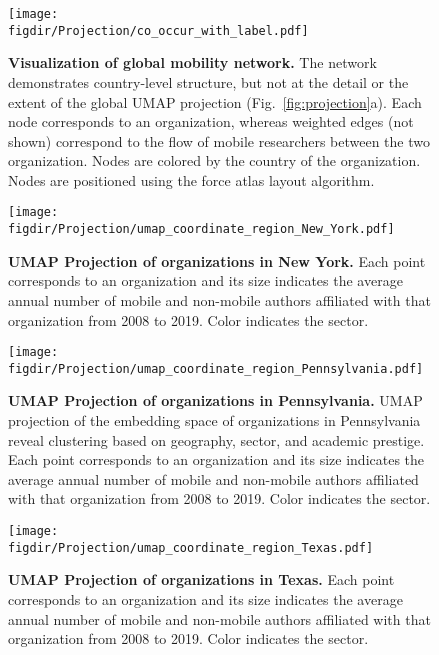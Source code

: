 \documentclass[12pt]{article} %
\def\figdir{../Figs}
\begin{document}
%
%
\begin{figure}[hp!]
	\centering
	\texttt{[image: \\figdir/Projection/co\_occur\_with\_label.pdf]}
	\caption{
		\textbf{Visualization of global mobility network.}
		The network demonstrates country-level structure, but not at the detail or the extent of the global UMAP projection (Fig.~\ref{fig:projection}a). 
		Each node corresponds to an organization, whereas  weighted edges (not shown) correspond to the flow of mobile researchers between the two organization.
		Nodes are colored by the country of the organization. 
		Nodes are positioned using the force atlas layout algorithm. 
	}
	\label{fig:supp:network_vis}
\end{figure}



%
%
\begin{figure}[hp!]
	\centering
	\texttt{[image: \\figdir/Projection/umap\_coordinate\_region\_New\_York.pdf]}
	\caption{
		\textbf{UMAP Projection of organizations in New York.}
		Each point corresponds to an organization and its size indicates the average annual number of mobile and non-mobile authors affiliated with that organization from 2008 to 2019. 
		Color indicates the sector. 
	}
	\label{fig:supp:proj_newyork}
\end{figure}


%
%
\begin{figure}[hp!]
	\centering
	\texttt{[image: \\figdir/Projection/umap\_coordinate\_region\_Pennsylvania.pdf]}
	\caption{
		\textbf{UMAP Projection of organizations in Pennsylvania.}
		UMAP projection of the embedding space of organizations in Pennsylvania reveal clustering based on geography, sector, and academic prestige.
		Each point corresponds to an organization and its size indicates the average annual number of mobile and non-mobile authors affiliated with that organization from 2008 to 2019. 
		Color indicates the sector. 
	}
	\label{fig:supp:proj_pennsylvania}
\end{figure}


%
%
\begin{figure}[hp!]
	\centering
	\texttt{[image: \\figdir/Projection/umap\_coordinate\_region\_Texas.pdf]}
	\caption{
		\textbf{UMAP Projection of organizations in Texas.}
		Each point corresponds to an organization and its size indicates the average annual number of mobile and non-mobile authors affiliated with that organization from 2008 to 2019. 
		Color indicates the sector. 
	}
	\label{fig:supp:proj_texas}
\end{figure}
\end{document}
